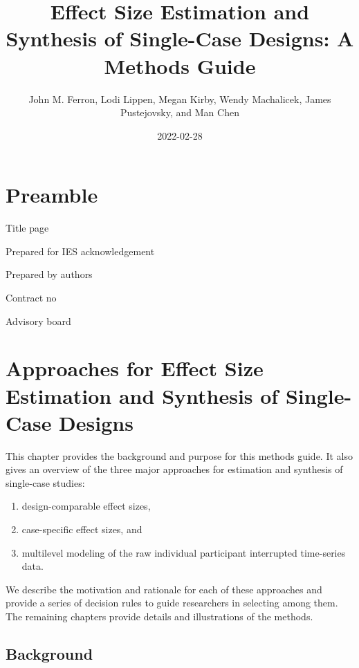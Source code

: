 \documentclass[
]{book}
\title{Effect Size Estimation and Synthesis of Single-Case Designs: A Methods Guide}
\author{John M. Ferron, Lodi Lippen, Megan Kirby, Wendy Machalicek, James Pustejovsky, and Man Chen}
\date{2022-02-28}
\providecommand{\tightlist}{%
  \setlength{\itemsep}{0pt}\setlength{\parskip}{0pt}}
\begin{document}
\maketitle

{
\setcounter{tocdepth}{1}
\tableofcontents
}
\hypertarget{preamble}{%
\chapter*{Preamble}\label{preamble}}

Title page

Prepared for IES acknowledgement

Prepared by authors

Contract no

Advisory board

\hypertarget{intro}{%
\chapter{Approaches for Effect Size Estimation and Synthesis of Single-Case Designs}\label{intro}}

This chapter provides the background and purpose for this methods guide. It also gives an overview of the three major approaches for estimation and synthesis of single-case studies:

\begin{enumerate}
\def\labelenumi{\alph{enumi})}
\tightlist
\item
  design-comparable effect sizes,
\item
  case-specific effect sizes, and
\item
  multilevel modeling of the raw individual participant interrupted time-series data.
\end{enumerate}

We describe the motivation and rationale for each of these approaches and provide a series of decision rules to guide researchers in selecting among them. The remaining chapters provide details and illustrations of the methods.

\hypertarget{background}{%
\section{Background}\label{background}}
\end{document}
